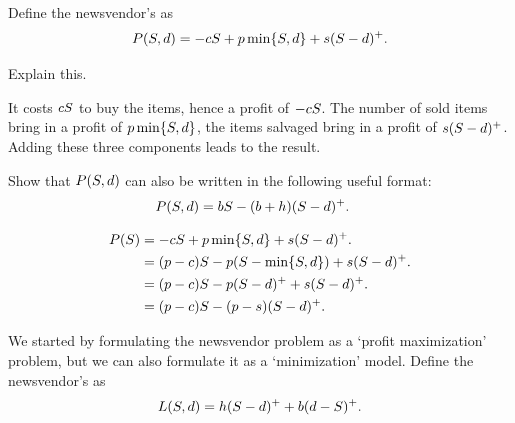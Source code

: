 Define the newsvendor's  as 
\begin{align*}
P(S, d) = -c S + p\min\{S,d\} + s(S-d)^+.
\end{align*}

\begin{exercise}
Explain this.
\begin{solution}
  It costs $c S$ to buy the items, hence a profit of $-c S$. The number of sold items bring in a profit of $p\min\{S, d\}$, the items salvaged bring in a profit of $s(S-d)^+$. Adding these three components leads to the result.
\end{solution}
\end{exercise}

\begin{exercise}
Show that $P(S, d)$ can also be written in the following useful format:
\begin{align}\label{eq:27}
P(S, d) 
&= b S - (b+h)(S-d)^+.
\end{align}
\begin{solution}
  \begin{align*}
P(S) 
&= -c S + p\min\{S,d\} + s(S-d)^+.\\
&= (p-c)S - p(S-\min\{S,d\}) + s(S-d)^+.\\
&= (p-c)S - p(S-d)^+ + s(S-d)^+.\\
&= (p-c)S - (p-s)(S-d)^+.
  \end{align*}
\end{solution}
\end{exercise}


We started by formulating the newsvendor problem as a `profit maximization' problem, but we can also formulate it as a `minimization' model.  Define the newsvendor's  as 
\begin{align}\label{eq:23}
L(S,d ) = h(S-d)^+ + b(d-S)^+.
\end{align}

